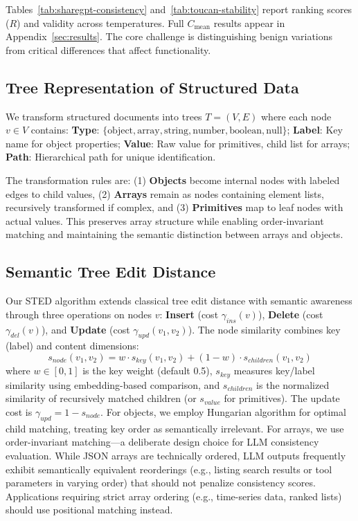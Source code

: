 \documentclass{article}
\theoremstyle{plain}
\theoremstyle{definition}
\begin{document}
Tables~\ref{tab:sharegpt-consistency} and~\ref{tab:toucan-stability} report ranking scores ($R$) and validity across temperatures. Full $C_{\text{mean}}$ results appear in Appendix~\ref{sec:results}. The core challenge is distinguishing benign variations from critical differences that affect functionality.

\subsection{Tree Representation of Structured Data}

We transform structured documents into trees $T = (V, E)$ where each node $v \in V$ contains: \textbf{Type}: $\{\text{object}, \text{array}, \text{string}, \text{number}, \text{boolean}, \text{null}\}$; \textbf{Label}: Key name for object properties; \textbf{Value}: Raw value for primitives, child list for arrays; \textbf{Path}: Hierarchical path for unique identification.

The transformation rules are: (1) \textbf{Objects} become internal nodes with labeled edges to child values, (2) \textbf{Arrays} remain as nodes containing element lists, recursively transformed if complex, and (3) \textbf{Primitives} map to leaf nodes with actual values. This preserves array structure while enabling order-invariant matching and maintaining the semantic distinction between arrays and objects.

\subsection{Semantic Tree Edit Distance}

Our STED algorithm extends classical tree edit distance with semantic awareness through three operations on nodes $v$: \textbf{Insert} (cost $\gamma_{ins}(v)$), \textbf{Delete} (cost $\gamma_{del}(v)$), and \textbf{Update} (cost $\gamma_{upd}(v_1, v_2)$). The node similarity combines key (label) and content dimensions:
\begin{equation}
s_{node}(v_1, v_2) = w \cdot s_{key}(v_1, v_2) + (1-w) \cdot s_{children}(v_1, v_2)
\end{equation}
where $w \in [0,1]$ is the key weight (default 0.5), $s_{key}$ measures key/label similarity using embedding-based comparison, and $s_{children}$ is the normalized similarity of recursively matched children (or $s_{value}$ for primitives). The update cost is $\gamma_{upd} = 1 - s_{node}$. For objects, we employ Hungarian algorithm for optimal child matching, treating key order as semantically irrelevant. For arrays, we use order-invariant matching---a deliberate design choice for LLM consistency evaluation. While JSON arrays are technically ordered, LLM outputs frequently exhibit semantically equivalent reorderings (e.g., listing search results or tool parameters in varying order) that should not penalize consistency scores. Applications requiring strict array ordering (e.g., time-series data, ranked lists) should use positional matching instead.
\end{document}
